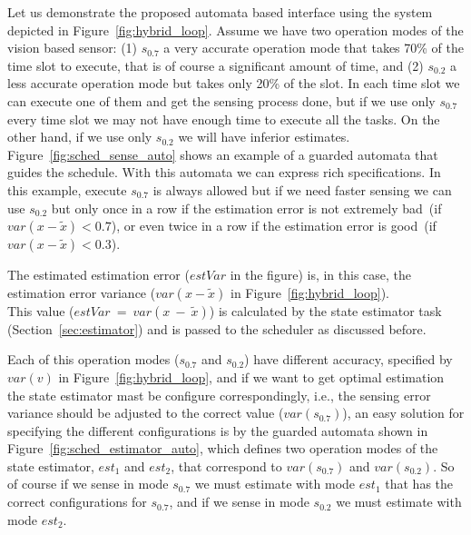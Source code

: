 \documentclass[ twoside, 12pt ]{article}
\begin{document}
{Let us demonstrate the proposed automata based interface using the system depicted in Figure~\ref{fig:hybrid_loop}.
Assume we have two operation modes of the vision based sensor: (1) $s_{0.7}$ a very accurate operation mode that takes 70\% of the time slot to execute, that is of course a significant amount of time, and (2) $s_{0.2}$ a less accurate operation mode but takes only 20\% of the slot.
In each time slot we can execute one of them and get the sensing process done, but if we use only $s_{0.7}$ every time slot we may not have enough time to execute all the tasks. On the other hand, if we use only $s_{0.2}$ we will have inferior estimates.
Figure~\ref{fig:sched_sense_auto} shows an example of a guarded automata that guides the schedule. With this automata we can express rich specifications. 
In this example, execute $s_{0.7}$ is always allowed but if we need faster sensing we can use $s_{0.2}$ but only once in a row if the estimation error is not extremely bad~(if~$var(x-\tilde{x}) < 0.7$), or even twice in a row if the estimation error is good~(if~$var(x-\tilde{x}) < 0.3$).

The estimated estimation error ($estVar$ in the figure) is, in this case, the estimation error variance ($var(x-\tilde{x})$ in Figure~\ref{fig:hybrid_loop}). 
\\This value ($estVar~=~var(x~-~\tilde{x})$) is calculated by the state estimator task (Section~\ref{sec:estimator}) and is passed to the scheduler as discussed before.

Each of this operation modes ($s_{0.7}$ and $s_{0.2}$) have different accuracy, specified by $var(v)$ in Figure~\ref{fig:hybrid_loop}, and if we want to get optimal estimation the state estimator mast be configure correspondingly, i.e., the sensing error variance should be adjusted to the correct value ($var(s_{0.7})$), an easy solution for specifying the different configurations is by the guarded automata shown in Figure~\ref{fig:sched_estimator_auto}, which defines two operation modes of the state estimator, $est_1$ and $est_2$, that correspond to $var(s_{0.7})$ and $var(s_{0.2})$. So of course if we sense in mode $s_{0.7}$ we must estimate with mode $est_1$ that has the correct configurations for $s_{0.7}$, and if we sense in mode $s_{0.2}$ we must estimate with mode $est_2$.    
}




\begin{titlepage}
    \hspace{3cm}
\end{titlepage}

%
\end{document}
